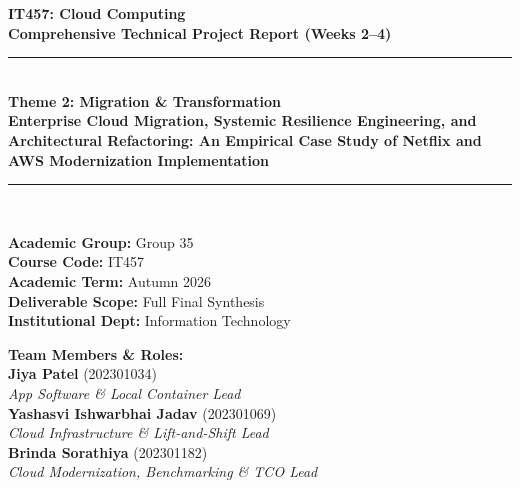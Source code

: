 \documentclass[11pt,a4paper]{article}
\begin{document}
\begin{titlepage}
    \centering
    \vspace*{0.8cm}
    
    {\Huge \bfseries \textcolor{netflixred}{IT457: Cloud Computing}}\\[0.3cm]
    {\LARGE \bfseries Comprehensive Technical Project Report (Weeks 2--4)}\\[1.2cm]
    
    \rule{\linewidth}{1.5pt}\\[0.4cm]
    {\huge \bfseries Theme 2: Migration \& Transformation}\\[0.3cm]
    {\LARGE \textbf{Enterprise Cloud Migration, Systemic Resilience Engineering, and Architectural Refactoring: An Empirical Case Study of Netflix and AWS Modernization Implementation}}\\[0.4cm]
    \rule{\linewidth}{1.5pt}\\[1.5cm]
    
    \begin{minipage}{0.48\textwidth}
        \begin{flushleft} \large
            \textbf{Academic Group:} Group 35\\
            \textbf{Course Code:} IT457\\
            \textbf{Academic Term:} Autumn 2026\\
            \textbf{Deliverable Scope:} Full Final Synthesis\\
            \textbf{Institutional Dept:} Information Technology
        \end{flushleft}
    \end{minipage}
    \hfill
    \begin{minipage}{0.48\textwidth}
        \begin{flushright} \large
            \textbf{Team Members \& Roles:}\\[0.2cm]
            \textbf{Jiya Patel} (202301034)\\
            \textit{App Software \& Local Container Lead}\\[0.2cm]
            \textbf{Yashasvi Ishwarbhai Jadav} (202301069)\\
            \textit{Cloud Infrastructure \& Lift-and-Shift Lead}\\[0.2cm]
            \textbf{Brinda Sorathiya} (202301182)\\
            \textit{Cloud Modernization, Benchmarking \& TCO Lead}
        \end{flushright}
    \end{minipage}
    

\end{titlepage}
\end{document}
